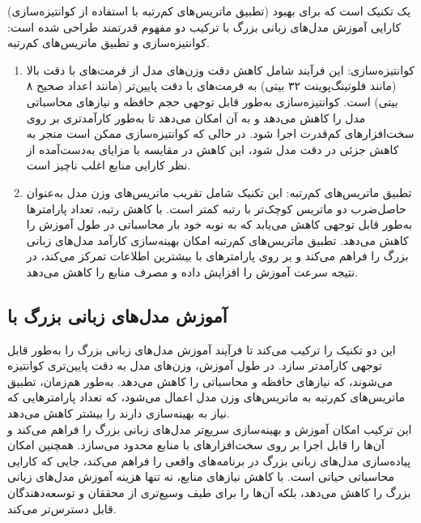  (تطبیق ماتریس‌های کم‌رتبه با استفاده از کوانتیزه‌سازی) یک تکنیک است که برای بهبود کارایی آموزش مدل‌های زبانی بزرگ با ترکیب دو مفهوم قدرتمند طراحی شده است: کوانتیزه‌سازی و تطبیق ماتریس‌های کم‌رتبه.
\begin{enumerate}
	\item
	      کوانتیزه‌سازی: این فرآیند شامل کاهش دقت وزن‌های مدل از فرمت‌های با دقت بالا (مانند فلوتینگ‌پوینت ۳۲ بیتی) به فرمت‌های با دقت پایین‌تر (مانند اعداد صحیح ۸ بیتی) است. کوانتیزه‌سازی به‌طور قابل توجهی حجم حافظه و نیازهای محاسباتی مدل را کاهش می‌دهد و به آن امکان می‌دهد تا به‌طور کارآمدتری بر روی سخت‌افزارهای کم‌قدرت اجرا شود. در حالی که کوانتیزه‌سازی ممکن است منجر به کاهش جزئی در دقت مدل شود، این کاهش در مقایسه با مزایای به‌دست‌آمده از نظر کارایی منابع اغلب ناچیز است.
	\item
	      تطبیق ماتریس‌های کم‌رتبه: این تکنیک شامل تقریب ماتریس‌های وزن مدل به‌عنوان حاصل‌ضرب دو ماتریس کوچک‌تر با رتبه کمتر است. با کاهش رتبه، تعداد پارامترها به‌طور قابل توجهی کاهش می‌یابد که به نوبه خود بار محاسباتی در طول آموزش را کاهش می‌دهد. تطبیق ماتریس‌های کم‌رتبه امکان بهینه‌سازی کارآمد مدل‌های زبانی بزرگ را فراهم می‌کند و بر روی پارامترهای با بیشترین اطلاعات تمرکز می‌کند، در نتیجه سرعت آموزش را افزایش داده و مصرف منابع را کاهش می‌دهد.
\end{enumerate}

\subsection{آموزش مدل‌های زبانی بزرگ با }

 این دو تکنیک را ترکیب می‌کند تا فرآیند آموزش مدل‌های زبانی بزرگ را به‌طور قابل توجهی کارآمدتر سازد. در طول آموزش، وزن‌های مدل به دقت پایین‌تری کوانتیزه می‌شوند، که نیازهای حافظه و محاسباتی را کاهش می‌دهد. به‌طور هم‌زمان، تطبیق ماتریس‌های کم‌رتبه به ماتریس‌های وزن مدل اعمال می‌شود، که تعداد پارامترهایی که نیاز به بهینه‌سازی دارند را بیشتر کاهش می‌دهد.
\\
این ترکیب امکان آموزش و بهینه‌سازی سریع‌تر مدل‌های زبانی بزرگ را فراهم می‌کند و آن‌ها را قابل اجرا بر روی سخت‌افزارهای با منابع محدود می‌سازد.  همچنین امکان پیاده‌سازی مدل‌های زبانی بزرگ در برنامه‌های واقعی را فراهم می‌کند، جایی که کارایی محاسباتی حیاتی است. با کاهش نیازهای منابع،  نه تنها هزینه آموزش مدل‌های زبانی بزرگ را کاهش می‌دهد، بلکه آن‌ها را برای طیف وسیع‌تری از محققان و توسعه‌دهندگان قابل دسترس‌تر می‌کند.
\\


